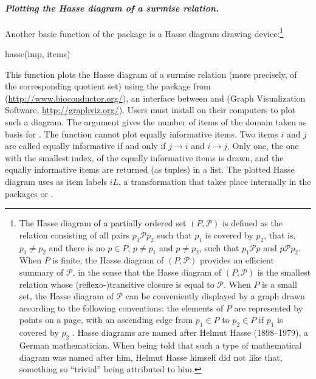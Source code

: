 \documentclass[nojss]{jss}
\begin{document}
\paragraph{\it Plotting the Hasse diagram of a surmise relation.}
Another basic function of the package  is a Hasse diagram drawing 
device:\footnote{\label{footnote:hasse}The Hasse diagram of a partially ordered set 
$(P,\mathcal{P})$ is defined as the relation consisting of all pairs $p_1\mathcal{P}p_2$ 
such that $p_1$ is covered by $p_2$, that is, $p_1\not=p_2$ and there is no 
$p\in P$, $p\not=p_1$ and $p\not=p_2$, such that $p_1\mathcal{P}p$ and 
$p\mathcal{P}p_2$. When $P$ is finite, the Hasse diagram of $(P,\mathcal{P})$ 
provides an efficient summary of $\mathcal{P}$, in the sense that the Hasse diagram 
of $(P,\mathcal{P})$ is the smallest relation whose (reflexo-)transitive closure is 
equal to $\mathcal{P}$.
When $P$ is a small set, the Hasse diagram of $\mathcal{P}$ 
can be conveniently displayed by a graph drawn according to the following conventions: 
the elements of $P$ are represented by points on a page, with an ascending edge 
from $p_1 \in P$ to $p_2 \in P$ if $p_1$ is covered by $p_2$ 
\citep[e.g.,][pp.\ 14--15]{DF:99}. Hasse diagrams are named after Helmut Hasse
 (1898--1979), a German mathematician. When being told that such a type of mathematical 
diagram was named after him, Helmut Hasse himself did not like that, something so 
``trivial'' being attributed to him.}
\begin{Code}
hasse(imp, items)
\end{Code}
This function plots the Hasse diagram of a surmise relation  
(more precisely, of the corresponding quotient set) 
using the package  \citep{graphviz} from  (\url{http://www.bioconductor.org/}), an interface between  and  
(Graph Visualization Software, \url{http://graphviz.org/}).  
Users must install  on their computers to plot such a diagram.
The argument  gives the number of items of the domain taken as basis for . 
The function  cannot plot equally informative items. Two items $i$ and $j$ 
are called equally informative if and only if $j \rightarrow i$ and $i \rightarrow j$.
Only one, the one with the smallest index, of the equally informative items is drawn, 
and the equally informative items are returned (as tuples) in a list.
The plotted Hasse diagram uses as item labels $iL$, a transformation that takes place internally 
in the packages  or . 
\end{document}
